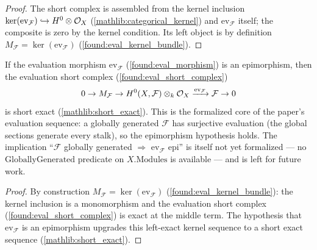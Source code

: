 \begin{proof}
  \leanok
  The short complex is assembled from the kernel inclusion
  \(\ker(\mathrm{ev}_{\mathcal F})\hookrightarrow H^0\otimes\mathcal{O}_X\)
  (\cref{mathlib:categorical_kernel}) and \(\mathrm{ev}_{\mathcal F}\) itself; the
  composite is zero by the kernel condition.  Its left object is by definition
  \(M_{\mathcal F}=\ker(\mathrm{ev}_{\mathcal F})\) (\cref{found:eval_kernel_bundle}).
\end{proof}

\begin{lemma}
  \label{found:eval_shortexact_of_globally_generated}
  If the evaluation morphism \(\mathrm{ev}_{\mathcal F}\) (\cref{found:eval_morphism}) is
  an epimorphism, then the evaluation short complex (\cref{found:eval_short_complex})
  \[
    0\to M_{\mathcal F}\to H^0(X,\mathcal F)\otimes_k\mathcal{O}_X
       \xrightarrow{\mathrm{ev}_{\mathcal F}}\mathcal F\to 0
  \]
  is short exact (\cref{mathlib:short_exact}).  This is the formalized core of the
  paper's evaluation sequence: a globally generated \(\mathcal F\) has surjective
  evaluation (the global sections generate every stalk), so the epimorphism hypothesis
  holds.  The implication ``\(\mathcal F\) globally generated \(\Rightarrow\)
  \(\mathrm{ev}_{\mathcal F}\) epi'' is itself not yet formalized --- no
  \(\mathrm{GloballyGenerated}\) predicate on \(X.\mathrm{Modules}\) is available ---
  and is left for future work.
\end{lemma}

\begin{proof}
  \leanok
  By construction \(M_{\mathcal F}=\ker(\mathrm{ev}_{\mathcal F})\)
  (\cref{found:eval_kernel_bundle}): the kernel inclusion is a monomorphism and the
  evaluation short complex (\cref{found:eval_short_complex}) is exact at the middle
  term.  The hypothesis that \(\mathrm{ev}_{\mathcal F}\) is an epimorphism upgrades this
  left-exact kernel sequence to a short exact sequence (\cref{mathlib:short_exact}).
\end{proof}


